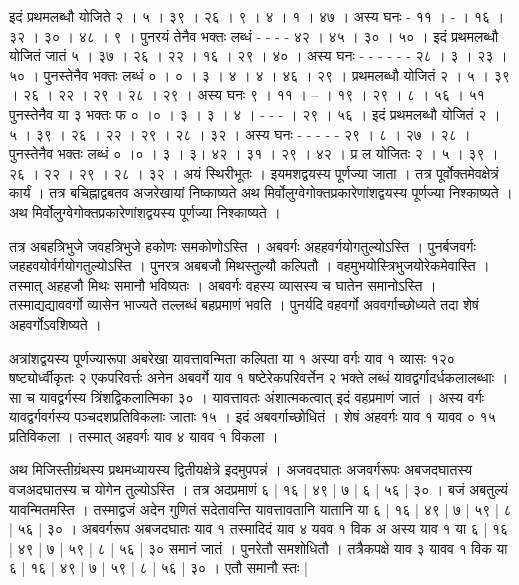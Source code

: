 \documentclass[11pt,a5paper]{book}
\begin{document}
{इदं प्रथमलब्धौ योजिते २ । ५ । ३९ । २६ ।  ९ । ४ । १ । ४७ । 
अस्य घनः - ११ । - । १६ । ३२ । ३० । ४८ । ९ । 
पुनरयं तेनैव भक्तः लब्धं - - - - ४२ । ४५ । ३० । ५० । 
इदं प्रथमलब्धौ योजितं जातं ५ । ३७ । २६ । २२ । १६ । २९ । ४० । 
अस्य घनः - - - - - - २८ । ३ । २३ । ५० । पुनस्तेनैव भक्तः लब्धं ० । ० । ३ । ४ । ४ । ४६ । २९ । 
प्रथमलब्धौ योजितं २ । ५ । ३९ । २६ । २२ । २९ । २८ । २९ । 
अस्य घनः ९ । ११ । -- । १९ । २९ । ८ । ५६ । ५१ पुनस्तेनैव या ३ भक्तः फ ० ।० । ३ । ३ । ४ । - - - । २९ । ५६ । 
इदं प्रथमलब्धौ योजितं २ । ५ । ३९ । २६ । २२ । २९ । २८ । ३२ । 
अस्य घनः - - - - - २९ । ८ । २७ । २८ । 
पुनस्तेनैव भक्तः लब्धं ० ।० । ३ । ३। ४२ । ३१ । २९ । ४२ । प्र ल योजितः २ । ५ । ३९ । २६ । २२ । २९ । २८ । ३२ । 
अयं स्थिरीभूतः । इयमशद्वयस्य पूर्णज्या जाता । तत्र पूर्वोक्तमेवक्षेत्रं कार्यं । 
तत्र बचिह्नाद्वबतव अजरेखायां निष्काष्यते अथ मिर्वोलुग्वेगोक्तप्रकारेणांशद्वयस्य पूर्णज्या निश्काष्यते । 
अथ मिर्वोलुग्वेगोक्तप्रकारेणांशद्वयस्य पूर्णज्या निश्काष्यते । 


तत्र अबहत्रिभुजे जवहत्रिभुजे हकोणः समकोणोऽस्ति । अबवर्गः अहहवर्गयोगतुल्योऽस्ति । 
पुनर्बजवर्गः जहहवयोर्वर्गयोगतुल्योऽस्ति । 
पुनरत्र अबबजौ मिथस्तुल्यौ कल्पितौ । वहमुभयोस्त्रिभुजयोरेकमेवास्ति । 
तस्मात् अहहजौ मिथः समानौ भविष्यतः । अबवर्गः वहस्य व्यासस्य च घातेन समानोऽस्ति । 
तस्माद्यद्याववर्गो व्यासेन भाज्यते तल्लब्धं बहप्रमाणं भवति ।
पुनर्यदि वहवर्गो अववर्गाच्छोध्यते तदा शेषं अहवर्गोऽवशिष्यते । 


अत्रांशद्वयस्य पूर्णज्यारूपा अबरेखा
यावत्तावन्मिता कल्पिता या १ अस्या वर्गः 
याव १ व्यासः १२० षष्ट्योर्ध्वीकृतः २ एकपरिवर्त्तः अनेन अबवर्गे याव १ षष्टेरेकपरिवर्त्तेन २ भक्ते लब्धं
यावद्वर्गादर्धकलालब्धाः । सा च यावद्वर्गस्य त्रिंशद्विकलात्मिका ३० ।
यावत्तावतः अंशात्मकत्वात् इदं वहप्रमाणं जातं । अस्य वर्गः यावद्वर्गवर्गस्य 
पञ्चदशप्रतिविकलाः जाताः १५ । इदं अबवर्गाच्छोधितं । 
शेषं अहवर्गः याव १ यावव ० १५ प्रतिविकला । तस्मात् अहवर्गः याव ४ यावव ${\dot{१}}$ विकला । 

अथ मिजिस्तीग्रंथस्य प्रथमध्यायस्य द्वितीयक्षेत्रे इदमुपपन्नं । अजवदघातः अजवर्गरूपः
अबजदघातस्य वजअदघातस्य च योगेन तुल्योऽस्ति । तत्र अदप्रमाणं ६ | १६ | ४९ | ७ | ६ | ५६ | ३० । 
बजं अबतुल्यं
यावन्मितमस्ति । तस्माद्वजं अदेन गुणितं सदेतावन्ति यावत्तावतानि यातानि या ६ | १६ | ४९ | ७ | ५९ | ८ | ५६ | ३० । 
अबवर्गरूप अबजदघातः याव १
तस्मादिदं याव ४ यवव १ विक अ अस्य याव १ या ६ | १६ | ४९ | ७ | ५९ | ८ | ५६ | ३० समानं जातं । 
पुनरेतौ समशोधितौ । तत्रैकपक्षे
याव ३ यावव १ विक या ६ | १६ | ४९ | ७ | ५९ | ८ | ५६ | ३० । एतौ समानौ स्तः |



}
\end{document}
